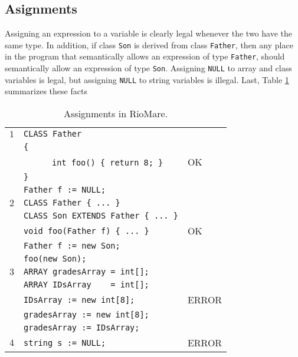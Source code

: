 \documentclass{article}
\begin{document}
\subsection{Asignments}
Assigning an expression to a variable is clearly legal whenever the two have the same type.
In addition, if class \verb"Son" is derived from class \verb"Father",
then any place in the program that semantically allows an expression of type \verb"Father",
should semantically allow an expression of type \verb"Son".
Assigning \verb"NULL" to array and class variables is legal,
but assigning \verb"NULL" to string variables is illegal.
Last, 
Table \ref{Table_Code_Examples_Assignments} summarizes these facts
\begin{table}[h]
\centering
\begin{tabular}{|l|l|l|}
\hline
 $1$ & \verb"CLASS Father"                       &    \\
     & \verb"{"                                  &    \\
     & ~ ~ ~ ~\verb"int foo() { return 8; }"     & OK \\
     & \verb"}"                                  &    \\
     & \verb"Father f := NULL;"                  &    \\
\hline
 $2$ & \verb"CLASS Father { ... }"             &    \\
     & \verb"CLASS Son EXTENDS Father { ... }" &    \\
     & \verb"void foo(Father f) { ... }"       & OK \\
     & \verb"Father f := new Son;"             &    \\
     & \verb"foo(new Son);"                    &    \\
\hline
 $3$ & \verb"ARRAY gradesArray = int[];" &       \\
     & \verb"ARRAY IDsArray    = int[];" &       \\
     & \verb"IDsArray := new int[8];"    & ERROR \\
     & \verb"gradesArray := new int[8];" &       \\
     & \verb"gradesArray := IDsArray;"   &       \\
\hline
 $4$ & \verb"string s := NULL;" & ERROR \\
\hline
\end{tabular}
\caption{Assignments in RioMare.
\label{Table_Code_Examples_Assignments}}
\end{table}
\end{document}
